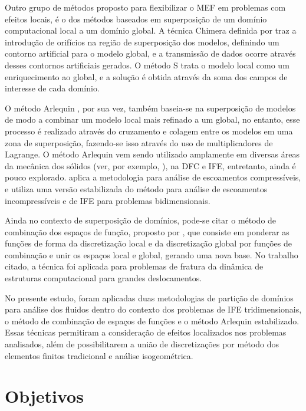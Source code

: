 Outro grupo de métodos proposto para flexibilizar o MEF em problemas com efeitos locais, é o dos métodos baseados em superposição de um domínio computacional local a um domínio global. A técnica Chimera definida por  traz a introdução de orifícios na região de superposição dos modelos, definindo um contorno artificial para o modelo global, e a transmissão de dados ocorre através desses contornos artificiais gerados. O método S \cite{Fish:1992} trata o modelo local como um enriquecimento ao global, e a solução é obtida através da soma dos campos de interesse de cada domínio.

O método Arlequin \cite{Dhia:1998,DhiaR:2001}, por sua vez, também baseia-se na superposição de modelos de modo a combinar um modelo local mais refinado a um global, no entanto, esse processo é realizado através do cruzamento e colagem entre os modelos em uma zona de superposição, fazendo-se isso através do uso de multiplicadores de Lagrange.  O método Arlequin vem sendo utilizado amplamente em diversas áreas da mecânica dos sólidos (ver, por exemplo, ), na DFC e IFE, entretanto, ainda é pouco explorado.  aplica a metodologia para análise de escoamentos compressíveis, e  utiliza uma versão estabilizada do método para análise de escoamentos incompressíveis e de IFE para problemas bidimensionais.

Ainda no contexto de superposição de domínios, pode-se citar o método de combinação dos espaços de função, proposto por , que consiste em ponderar as funções de forma da discretização local e da discretização global por funções de combinação e unir os espaços local e global, gerando uma nova base. No trabalho citado, a técnica foi aplicada para problemas de fratura da dinâmica de estruturas computacional para grandes deslocamentos.

No presente estudo, foram aplicadas duas metodologias de partição de domínios para análise dos fluidos dentro do contexto dos problemas de IFE tridimensionais, o método de combinação de espaços de funções e o método Arlequin estabilizado. Essas técnicas permitiram a consideração de efeitos localizados nos problemas analisados, além de possibilitarem a união de discretizações por método dos elementos finitos tradicional e análise isogeométrica.

\section[Objetivos]{Objetivos}

